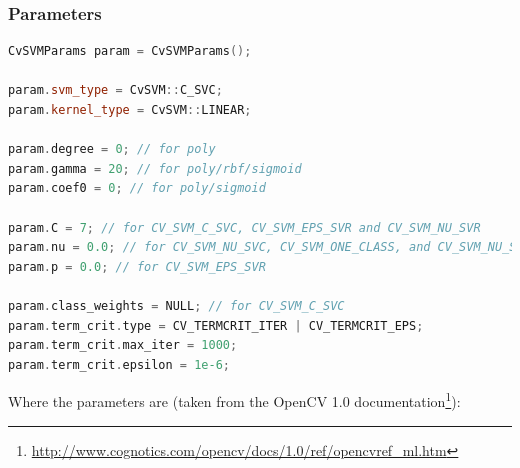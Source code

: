 \subsubsection*{Parameters}
\begin{lstlisting}[language=C++, caption=Example CvSVMParams, label=lst:cvsvmparams]
CvSVMParams param = CvSVMParams();

param.svm_type = CvSVM::C_SVC;
param.kernel_type = CvSVM::LINEAR;

param.degree = 0; // for poly
param.gamma = 20; // for poly/rbf/sigmoid
param.coef0 = 0; // for poly/sigmoid

param.C = 7; // for CV_SVM_C_SVC, CV_SVM_EPS_SVR and CV_SVM_NU_SVR
param.nu = 0.0; // for CV_SVM_NU_SVC, CV_SVM_ONE_CLASS, and CV_SVM_NU_SVR
param.p = 0.0; // for CV_SVM_EPS_SVR

param.class_weights = NULL; // for CV_SVM_C_SVC
param.term_crit.type = CV_TERMCRIT_ITER | CV_TERMCRIT_EPS;
param.term_crit.max_iter = 1000;
param.term_crit.epsilon = 1e-6;
\end{lstlisting}
Where the parameters are (taken from the OpenCV 1.0 documentation\footnote{\url{http://www.cognotics.com/opencv/docs/1.0/ref/opencvref_ml.htm}}):
